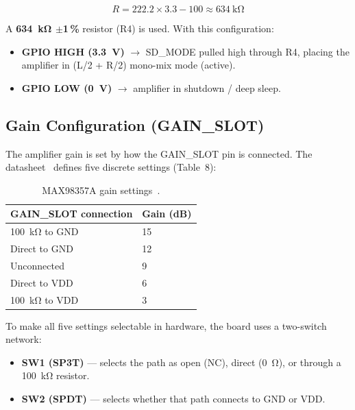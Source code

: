 \begin{equation}
  R = 222.2 \times 3.3 - 100 \approx \SI{634}{\kilo\ohm}
  \label{eq:sdmode-val}
\end{equation}

A \textbf{\SI{634}{\kilo\ohm} $\pm$1\,\%} resistor (R4) is used. With this configuration:

\begin{itemize}
  \item \textbf{GPIO HIGH (\SI{3.3}{\volt})} $\rightarrow$ SD\_MODE pulled high through
        R4, placing the amplifier in (L/2 + R/2) mono-mix mode (active).
  \item \textbf{GPIO LOW (\SI{0}{\volt})} $\rightarrow$ amplifier in shutdown / deep
        sleep.
\end{itemize}

\subsection{Gain Configuration (GAIN\_SLOT)}
\label{subsec:gain}

The amplifier gain is set by how the GAIN\_SLOT pin is connected. The
datasheet~\cite{ref6} defines five discrete settings (Table~8):

\begin{table}[htbp]
  \centering
  \caption{MAX98357A gain settings~\cite{ref6}.}
  \label{tab:gain}
  \begin{tabular}{ll}
    \toprule
    GAIN\_SLOT connection         & Gain (dB) \\
    \midrule
    \SI{100}{\kilo\ohm} to GND   & 15 \\
    Direct to GND                & 12 \\
    Unconnected                  & 9  \\
    Direct to VDD                & 6  \\
    \SI{100}{\kilo\ohm} to VDD   & 3  \\
    \bottomrule
  \end{tabular}
\end{table}

To make all five settings selectable in hardware, the board uses a two-switch network:

\begin{itemize}
  \item \textbf{SW1 (SP3T)} --- selects the path as open (NC), direct
        (\SI{0}{\ohm}), or through a \SI{100}{\kilo\ohm} resistor.
  \item \textbf{SW2 (SPDT)} --- selects whether that path connects to GND or VDD.
\end{itemize}

